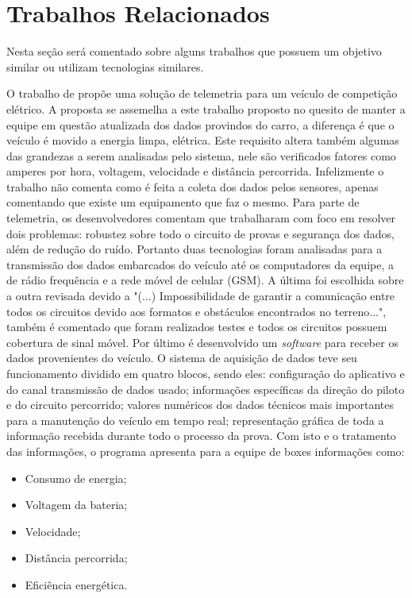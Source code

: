 \chapter{Trabalhos Relacionados}
	\label{ch:trabalhos}
Nesta seção será comentado sobre alguns trabalhos que possuem um objetivo similar ou utilizam tecnologias similares. 

O trabalho de  propõe uma solução de telemetria para um veículo de competição elétrico. A proposta se assemelha a este trabalho proposto no quesito de manter a equipe em questão atualizada dos dados provindos do carro, a diferença é que o veículo é movido a energia limpa, elétrica. Este requisito altera também algumas das grandezas a serem analisadas pelo sistema, nele são verificados fatores como amperes por hora, voltagem, velocidade e distância percorrida. Infelizmente o trabalho não comenta como é feita a coleta dos dados pelos sensores, apenas comentando que existe um equipamento que faz o mesmo. Para parte de telemetria, os desenvolvedores comentam que trabalharam com foco em resolver dois problemas: robustez sobre todo o circuito de provas e segurança dos dados, além de redução do ruído. Portanto duas tecnologias foram analisadas para a transmissão dos dados embarcados do veículo até os computadores da equipe, a de rádio frequência e a rede móvel de celular (GSM). A última foi escolhida sobre a outra revisada devido a "(...) Impossibilidade de garantir a comunicação entre todos os circuitos devido aos formatos e obstáculos encontrados no terreno...", também é comentado que foram realizados testes e todos os circuitos possuem cobertura de sinal móvel. Por último é desenvolvido um \textit{software} para receber os dados provenientes do veículo. O sistema de aquisição de dados teve seu funcionamento dividido em quatro blocos, sendo eles: configuração do aplicativo e do canal transmissão de dados usado; informações específicas da direção do piloto e do circuito percorrido; valores numéricos dos dados técnicos mais importantes para a manutenção do veículo em tempo real; representação gráfica de toda a informação recebida durante todo o processo da prova. Com isto e o tratamento das informações, o programa apresenta para a equipe de boxes informações como:

\begin{itemize}
	\item Consumo de energia; 
	\item Voltagem da bateria;
	\item Velocidade;
	\item Distância percorrida;
	\item Eficiência energética.
\end{itemize}

